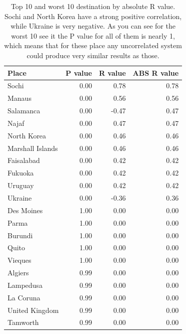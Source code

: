 \documentclass[minf,twoside,singlespacing,parskip,frontabs]{infthesis}
\begin{document}
\begin{table}[p!]
\begin{center}
\begin{tabular}{ l | r | r | r}
\textbf{Place} & \textbf{P value} & \textbf{R value} & \textbf{ABS R value}\\
\hline
Sochi & 0.00 & 0.78 & 0.78\\
Manaus & 0.00 & 0.56 & 0.56\\
Salamanca & 0.00 & -0.47 & 0.47\\
Najaf & 0.00 & 0.47 & 0.47\\
North Korea & 0.00 & 0.46 & 0.46\\
Marshall Islands & 0.00 & 0.46 & 0.46\\
Faisalabad & 0.00 & 0.42 & 0.42\\
Fukuoka & 0.00 & 0.42 & 0.42\\
Uruguay & 0.00 & 0.42 & 0.42\\
Ukraine & 0.00 & -0.36 & 0.36 \\
\hline
\hline
Des Moines & 1.00 & 0.00 & 0.00\\
Parma & 1.00 & 0.00 & 0.00\\
Burundi & 1.00 & 0.00 & 0.00\\
Quito & 1.00 & 0.00 & 0.00\\
Vieques & 1.00 & 0.00 & 0.00\\
Algiers & 0.99 & 0.00 & 0.00\\
Lampedusa & 0.99 & 0.00 & 0.00\\
La Coruna & 0.99 & 0.00 & 0.00\\
United Kingdom & 0.99 & 0.00 & 0.00\\
Tamworth & 0.99 & 0.00 & 0.00\\
\end{tabular}
\end{center}
\caption{Top 10 and worst 10 destination by absolute R value. Sochi and North Korea have a strong positive correlation, while Ukraine is very negative. As you can see for the worst 10 see it the P value for all of them is nearly 1, which means that for these place any uncorrelated system could produce very similar results as those. }
\end{table}
\end{document}
